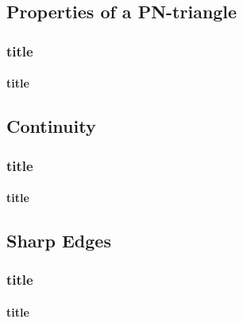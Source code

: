 \subsection{Properties of a PN-triangle}
\begin{frame}
	\frametitle{title}
	\framesubtitle{title}
\end{frame}

\subsection{Continuity}
\begin{frame}
	\frametitle{title}
    \framesubtitle{title}
\end{frame}

\subsection{Sharp Edges}
\begin{frame}
	\frametitle{title}
    \framesubtitle{title}
\end{frame}